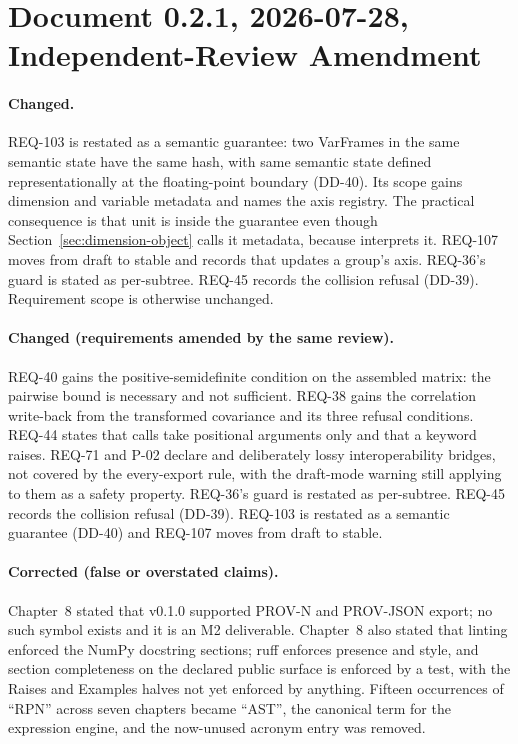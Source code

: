 \section*{Document 0.2.1, 2026-07-28, Independent-Review Amendment}

\paragraph{Changed.} REQ-103 is
restated as a semantic guarantee: two VarFrames in the same semantic
state have the same hash, with same semantic state defined
representationally at the floating-point boundary (DD-40). Its scope
gains dimension and variable metadata and names the axis registry. The
practical consequence is that unit is inside the guarantee even though
Section~\ref{sec:dimension-object} calls it metadata, because
 interprets it. REQ-107 moves from draft to stable and
records that  updates a group's axis. REQ-36's guard is
stated as per-subtree. REQ-45 records the \code{[constants]} collision
refusal (DD-39). Requirement scope is otherwise unchanged.

\paragraph{Changed (requirements amended by the same review).} REQ-40
gains the positive-semidefinite condition on the assembled matrix: the
pairwise bound is necessary and not sufficient. REQ-38 gains the
correlation write-back from the transformed covariance and its three
refusal conditions. REQ-44 states that calls take positional arguments
only and that a keyword raises. REQ-71 and P-02 declare
 and  deliberately lossy
interoperability bridges, not covered by the every-export rule, with
the draft-mode warning still applying to them as a safety property.
REQ-36's guard is restated as per-subtree. REQ-45 records the
\code{[constants]} collision refusal (DD-39). REQ-103 is restated as a
semantic guarantee (DD-40) and REQ-107 moves from draft to stable.

\paragraph{Corrected (false or overstated claims).} Chapter~8 stated
that v0.1.0 supported PROV-N and PROV-JSON export; no such symbol
exists and it is an M2 deliverable. Chapter~8 also stated that linting
enforced the NumPy docstring sections; ruff enforces presence and
style, and section completeness on the declared public surface is
enforced by a test, with the Raises and Examples halves not yet
enforced by anything. Fifteen occurrences of ``RPN'' across seven
chapters became ``AST'', the canonical term for the expression engine,
and the now-unused acronym entry was removed.

